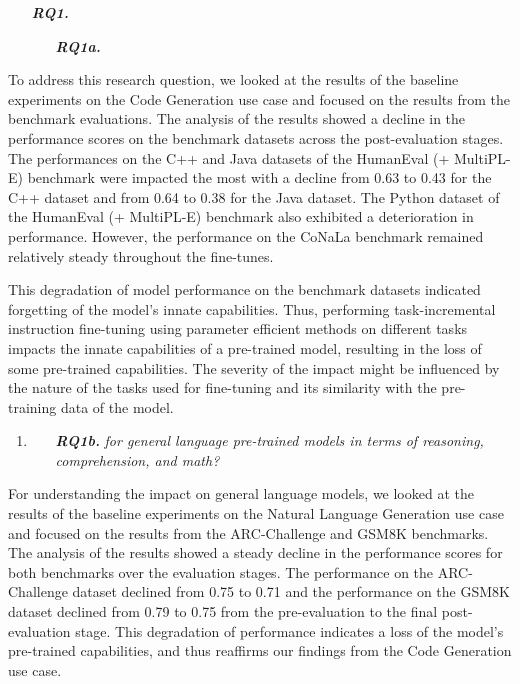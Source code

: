 \begin{enumerate}
    \item[\textit{\textbf{RQ1.}}] \textit{\RQone}
    \begin{enumerate}
        \item[\textit{\textbf{RQ1a.}}] \textit{\RQonea}
    \end{enumerate}
\end{enumerate}

To address this research question, we looked at the results of the baseline experiments on the Code Generation use case and focused on the results from the benchmark evaluations. The analysis of the results showed a decline in the performance scores on the benchmark datasets across the post-evaluation stages. The performances on the C++ and Java datasets of the HumanEval (+ MultiPL-E) benchmark were impacted the most with a decline from 0.63 to 0.43 for the C++ dataset and from 0.64 to 0.38 for the Java dataset. The Python dataset of the HumanEval (+ MultiPL-E) benchmark also exhibited a deterioration in performance. However, the performance on the CoNaLa benchmark remained relatively steady throughout the fine-tunes. 

This degradation of model performance on the benchmark datasets indicated forgetting of the model’s innate capabilities. Thus, performing task-incremental instruction fine-tuning using parameter efficient methods on different tasks impacts the innate capabilities of a pre-trained model, resulting in the loss of some pre-trained capabilities. The severity of the impact might be influenced by the nature of the tasks used for fine-tuning and its similarity with the pre-training data of the model. 

\newcommand{\RQoneb}{for general language pre-trained models in terms of reasoning, comprehension, and math?}

\begin{enumerate}
\item  
    \begin{enumerate}
        \item[\textit{\textbf{RQ1b.}}] \textit{\RQoneb}
    \end{enumerate}
\end{enumerate}

For understanding the impact on general language models, we looked at the results of the baseline experiments on the Natural Language Generation use case and focused on the results from the ARC-Challenge and GSM8K benchmarks. The analysis of the results showed a steady decline in the performance scores for both benchmarks over the evaluation stages. The performance on the ARC-Challenge dataset declined from 0.75 to 0.71 and the performance on the GSM8K dataset declined from 0.79 to 0.75 from the pre-evaluation to the final post-evaluation stage. This degradation of performance indicates a loss of the model’s pre-trained capabilities, and thus reaffirms our findings from the Code Generation use case.

